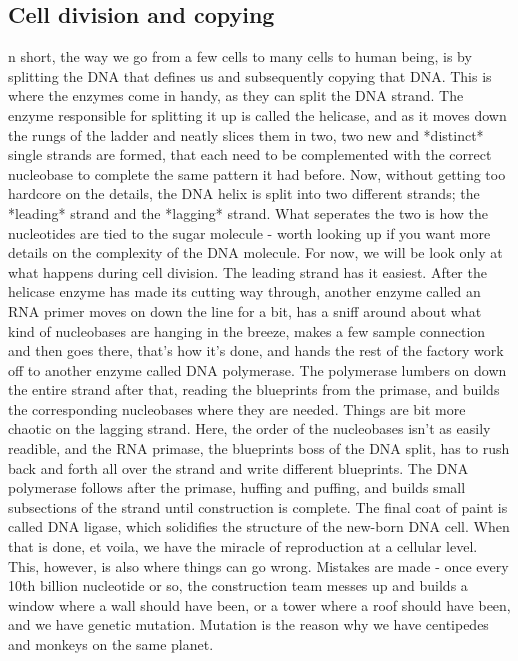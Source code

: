 \subsection{Cell division and copying}
n short, the way we go from a few cells to many cells to human being, is by splitting the DNA that defines us and subsequently copying that DNA. This is where the enzymes come in handy, as they can split the DNA strand. The enzyme responsible for splitting it up is called the helicase, and as it moves down the rungs of the ladder and neatly slices them in two, two new and *distinct* single strands are formed, that each need to be complemented with the correct nucleobase to complete the same pattern it had before. Now, without getting too hardcore on the details, the DNA helix is split into two different strands; the *leading* strand and the *lagging* strand. What seperates the two is how the nucleotides are tied to the sugar molecule - worth looking up if you want more details on the complexity of the DNA molecule. For now, we will be look only at what happens during cell division.
The leading strand has it easiest. After the helicase enzyme has made its cutting way through, another enzyme called an RNA primer moves on down the line for a bit, has a sniff around about what kind of nucleobases are hanging in the breeze, makes a few sample connection and then goes there, that's how it's done, and hands the rest of the factory work off to another enzyme called DNA polymerase. The polymerase lumbers on down the entire strand after that, reading the blueprints from the primase, and builds the corresponding nucleobases where they are needed. 
Things are bit more chaotic on the lagging strand. Here, the order of the nucleobases isn't as easily readible, and the RNA primase, the blueprints boss of the DNA split, has to rush back and forth all over the strand and write different blueprints. The DNA polymerase follows after the primase, huffing and puffing, and builds small subsections of the strand until construction is complete.
The final coat of paint is called DNA ligase, which solidifies the structure of the new-born DNA cell. When that is done, et voila, we have the miracle of reproduction at a cellular level. 
This, however, is also where things can go wrong. Mistakes are made - once every 10th billion nucleotide or so, the construction team messes up and builds a window where a wall should have been, or a tower where a roof should have been, and we have genetic mutation. Mutation is the reason why we have centipedes and monkeys on the same planet. 

